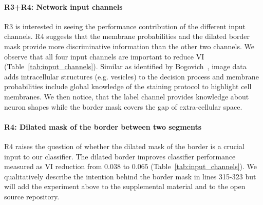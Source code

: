 \documentclass[10pt,twocolumn,letterpaper]{article}
\begin{document}
\paragraph{R3+R4: Network input channels} R3 is interested in seeing the performance contribution of the different input channels. R4 suggests that the membrane probabilities and the dilated border mask provide more discriminative information than the other two channels. We observe that all four input channels are important to reduce VI (Table~\ref{tab:input_channels}). Similar as identified by Bogovich~\etal, image data adds intracellular structures (e.g. vesicles) to the decision process and membrane probabilities include global knowledge of the staining protocol to highlight cell membranes. We then notice, that the label channel provides knowledge about neuron shapes while the border mask covers the gap of extra-cellular space.

\begin{table}[h]
\caption{We evaluate automatic selection on the AC4 subvolume ($p_t=0.95$) using the GP classifier with different input channels and report median VI reduction. The combination of all four channels performs best.}
\label{tab:input_channels}
\end{table}

\paragraph{R4: Dilated mask of the border between two segments} R4 raises the question of whether the dilated mask of the border is a crucial input to our classifier. The dilated border improves classifier performance measured as VI reduction from $0.038$ to $0.065$ (Table~\ref{tab:input_channels}). We qualitatively describe the intention behind the border mask in lines 315-323 but will add the experiment above to the supplemental material and to the open source repository.
\end{document}
